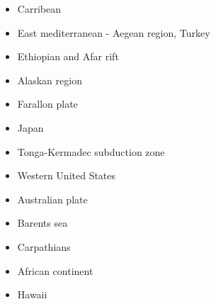\begin{itemize}
\cite{fihv13b}
\cite{dual19}
\item{Carribean} 
\item{East mediterranean - Aegean region, Turkey} 
\cite{cazf10}
\item{Ethiopian and Afar rift} 
\cite{mitk07}
\cite{cort08}
\cite{kekj09}
\cite{beve10}
\cite{phcs14}
\cite{brcr17}
\cite{brcg17}
\cite{cocf19}
\item{Alaskan region} 
\cite{jabi12}
\cite{jabr13}
\cite{haja17}
\cite{mimo18}
\item{Farallon plate} 
\cite{lisg08}
\item{Japan} 
\cite{lohd07}\cite{kigk14}\cite{leli14}\cite{kilk15}
\item{Tonga-Kermadec subduction zone} 
\cite{bigs03}\cite{bigu03}
\item{Western United States}
\cite{besb06}
\item Australian plate 
\cite{himu03}\cite{wemv03}
\cite{hazs10}
\item Barents sea 
\cite{buto07b}
\cite{gahs14}
\item Carpathians 
\cite{sepg19}
\item African continent 
\cite{vabt11}
\cite{busm12}
\item Hawaii 
\cite{tabs09}

\end{itemize}






